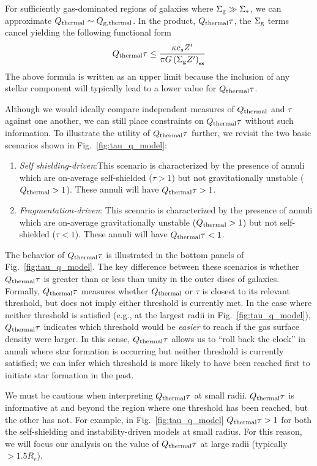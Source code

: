 \documentclass[fleqn,usenatbib]{mnras}
\newcommand{\qh}{Q_{\rm thermal}}
\newcommand{\qgh}{Q_{\rm g,thermal}}
\begin{document}
For sufficiently gas-dominated regions of galaxies where $\Sigma_{\rm g} \gg \Sigma_*$, we can approximate $\qh\sim\qgh$. In the product, $\qh\tau$, the $\Sigma_{\rm g}$ terms cancel yielding the following functional form 
\begin{equation} \label{eq:qtau_approx}
\qh\tau \leq \frac{\kappa c_s Z'}{\pi G \left(\Sigma_{\rm g} Z'\right)_{\rm ss}}
\end{equation}
The above formula is written as an upper limit because the inclusion of any stellar component will typically lead to a lower value for $\qh\tau$.  

Although we would ideally compare independent measures of $\qh$ and $\tau$ against one another, we can still place constraints on $\qh\tau$ without such information. To illustrate the utility of $\qh\tau$ further, we revisit the two basic scenarios shown in Fig.~\ref{fig:tau_q_model}:
\begin{enumerate}
\item {\it Self shielding-driven}:This scenario is characterized by the presence of annuli which are on-average self-shielded ($\tau>1$) but not gravitationally unstable ($\qh>1$).  These annuli will have $\qh\tau>1$.
\item {\it Fragmentation-driven}: This scenario is characterized by the presence of annuli which are on-average gravitationally unstable ($\qh>1$) but not self-shielded ($\tau<1$). These annuli will have $\qh\tau<1$.
\end{enumerate} 
The behavior of $\qh\tau$ is illustrated in the bottom panels of Fig.~\ref{fig:tau_q_model}. The key difference between these scenarios is whether $\qh\tau$ is greater than or less than unity in the outer discs of galaxies. Formally, $\qh\tau$ measures whether $\qh$ or $\tau$ is closest to its relevant threshold, but does not imply either threshold is currently met. In the case where neither threshold is satisfied (e.g., at the largest radii in Fig.~\ref{fig:tau_q_model}), $\qh\tau$ indicates which threshold would be {\it easier} to reach if the gas surface density were larger. In this sense, $\qh\tau$ allows us to ``roll back the clock'' in annuli where star formation is occurring but neither threshold is currently satisfied; we can infer which threshold is more likely to have been reached first to initiate star formation in the past.
 
We must be cautious when interpreting $\qh\tau$ at small radii. $\qh\tau$ is informative at and beyond the region where one threshold has been reached, but the other has not. For example, in Fig.~\ref{fig:tau_q_model} $\qh\tau>1$ for both the self-shielding and instability-driven models at small radius.  For this reason, we will focus our analysis on the value of $\qh\tau$ at large radii (typically $>1.5R_e$). 
 
\end{document}
